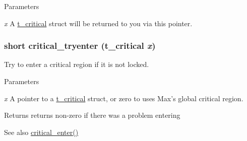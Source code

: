 \begin{DoxyParams}{Parameters}
\item[{\em x}]A \hyperlink{group__critical_gaa00494020fc3fa3005b63a294cab3886}{t\_\-critical} struct will be returned to you via this pointer. \end{DoxyParams}
\hypertarget{group__critical_ga0a4109d5c2b82f0c1022015abac175dc}{
\subsubsection[{critical\_\-tryenter}]{\setlength{\rightskip}{0pt plus 5cm}short critical\_\-tryenter ({\bf t\_\-critical} {\em x})}}
\label{group__critical_ga0a4109d5c2b82f0c1022015abac175dc}


Try to enter a critical region if it is not locked. 
\begin{DoxyParams}{Parameters}
\item[{\em x}]A pointer to a \hyperlink{group__critical_gaa00494020fc3fa3005b63a294cab3886}{t\_\-critical} struct, or zero to uses Max’s global critical region. \end{DoxyParams}
\begin{DoxyReturn}{Returns}
returns non-\/zero if there was a problem entering 
\end{DoxyReturn}
\begin{DoxySeeAlso}{See also}
\hyperlink{group__critical_ga246445cffc822f756ac6fb34a055022d}{critical\_\-enter()} 
\end{DoxySeeAlso}

